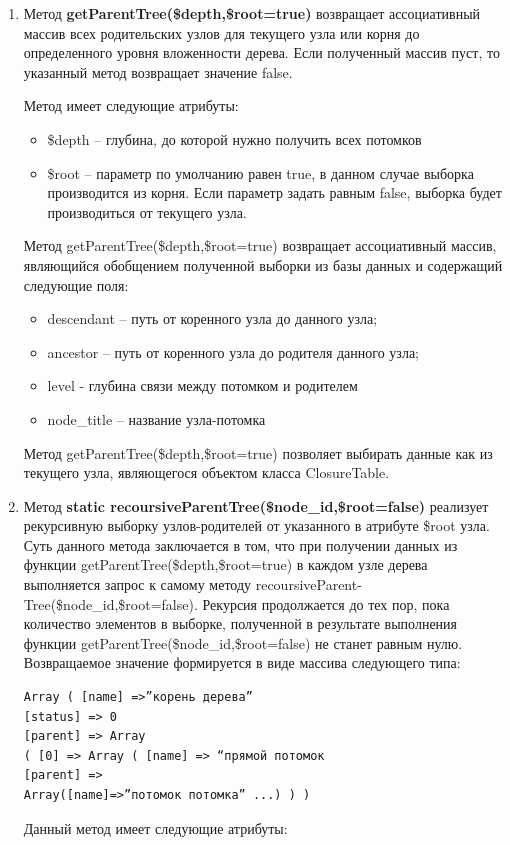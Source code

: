 \documentclass[a4paper,14pt]{extreport}
\theoremstyle{definition}
\begin{document}
\begin{enumerate}
\item Метод \textbf{getParentTree(\$depth,\$root=true)} возвращает ассоциативный массив всех родительских узлов для текущего узла или корня до определенного уровня вложенности дерева. Если полученный массив пуст, то указанный метод возвращает значение false.

Метод имеет следующие атрибуты:
\begin{itemize}
\item \$depth – глубина, до которой нужно получить всех потомков
\item \$root – параметр по умолчанию равен true, в данном случае выборка производится из корня. Если параметр задать равным false, выборка будет производиться от текущего узла.
\end{itemize}

Метод getParentTree(\$depth,\$root=true) возвращает ассоциативный массив, являющийся обобщением полученной выборки из базы данных и содержащий следующие поля:
\begin{itemize}
\item descendant – путь от коренного узла до данного узла;
\item ancestor – путь от коренного узла до родителя данного узла;
\item level - глубина связи между потомком и родителем
\item node\_title – название узла-потомка
\end{itemize}
Метод getParentTree(\$depth,\$root=true) позволяет выбирать данные как из текущего узла, являющегося объектом класса ClosureTable.
\item Метод \textbf{static recoursiveParentTree(\$node\_id,\$root=false) }реализует рекурсивную выборку узлов-родителей от указанного в атрибуте \$root узла. Суть данного метода заключается в том, что при получении данных из функции getParentTree(\$depth,\$root=true) в каждом узле дерева выполняется запрос к самому методу recoursiveParent-\\Tree(\$node\_id,\$root=false). Рекурсия продолжается до тех пор, пока количество элементов в выборке, полученной в результате выполнения функции getParentTree(\$node\_id,\$root=false) не станет равным нулю. Возвращаемое значение формируется в виде массива следующего типа:
\begin{verbatim}Array ( [name] =>”корень дерева”
[status] => 0
[parent] => Array
( [0] => Array ( [name] => “прямой потомок
[parent] =>
Array([name]=>”потомок потомка” ...) ) )\end{verbatim}
Данный метод имеет следующие атрибуты:

\end{enumerate}
\end{document}
